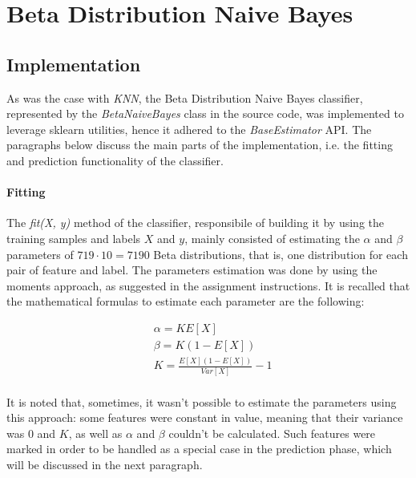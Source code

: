 \newpage
\section{Beta Distribution Naive Bayes}

\subsection{Implementation}

As was the case with \textit{KNN}, the Beta Distribution Naive Bayes classifier, represented by the \textit{BetaNaiveBayes} class in the source code, was implemented to leverage sklearn utilities, hence it adhered to the \textit{BaseEstimator} API.
The paragraphs below discuss the main parts of the implementation, i.e. the fitting and prediction functionality of the classifier.

\paragraph{Fitting} The \textit{fit(X, y)} method of the classifier, responsibile of building it by using the training samples and labels $X$ and $y$, mainly consisted of estimating the $\alpha$ and $\beta$ parameters of $719 \cdot 10 = 7190$ Beta distributions, that is, one distribution for each pair of feature and label.
The parameters estimation was done by using the moments approach, as suggested in the assignment instructions. It is recalled that the mathematical formulas to estimate each parameter are the following:

$$
\begin{aligned}
    & \alpha = KE[X] \\
    & \beta = K(1 - E[X]) \\
    & K = \frac{
        E[X](1 - E[X])
    }{
        Var[X]
    } - 1 \\
\end{aligned}
$$

It is noted that, sometimes, it wasn't possible to estimate the parameters using this approach: some features were constant in value, meaning that their variance was 0 and $K$, as well as $\alpha$ and $\beta$ couldn't be calculated. Such features were marked in order to be handled as a special case in the prediction phase, which will be discussed in the next paragraph.

